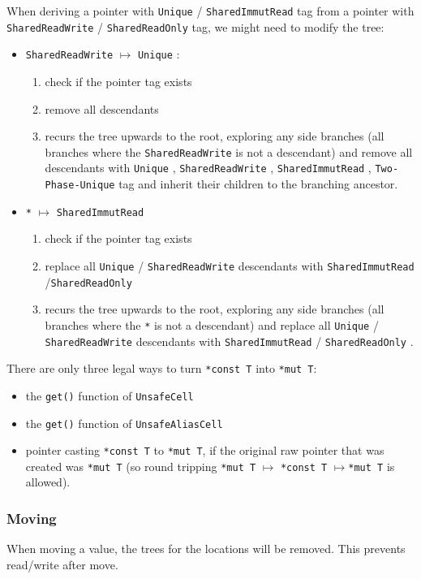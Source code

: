 \documentclass[]{article}
\newcommand{\SHRW}{\texttt{SharedReadWrite} }
\newcommand{\SHRO}{\texttt{SharedReadOnly} }
\newcommand{\SHIR}{\texttt{SharedImmutRead} }
\newcommand{\UNQ}{\texttt{Unique} }
\newcommand{\TPU}{\texttt{Two-Phase-Unique} }
\begin{document}
When deriving a pointer with \UNQ / \SHIR tag from a pointer with \SHRW / \SHRO tag, we might need to modify the tree:
\begin{itemize}
    \item \SHRW $\mapsto$ \UNQ:
    \begin{enumerate}
        \item check if the pointer tag exists
        \item remove all descendants
        \item recurs the tree upwards to the root, exploring any side branches (all branches where the \SHRW is not a descendant) and remove all descendants with \UNQ, \SHRW, \SHIR, \TPU tag and inherit their children to the branching ancestor.
    \end{enumerate}
    \item \texttt{*} $\mapsto$ \SHIR
    \begin{enumerate}
        \item check if the pointer tag exists
        \item replace all \UNQ/ \SHRW descendants with \SHIR/\SHRO
        \item recurs the tree upwards to the root, exploring any side branches (all branches where the \texttt{*} is not a descendant) and replace all \UNQ/ \SHRW descendants with \SHIR/ \SHRO.
    \end{enumerate}
\end{itemize}

\noindent There are only three legal ways to turn \texttt{*const T} into \texttt{*mut T}:
\begin{itemize}
    \item the \texttt{get()} function of \texttt{UnsafeCell}
    \item the \texttt{get()} function of \texttt{UnsafeAliasCell}
    \item pointer casting \texttt{*const T} to \texttt{*mut T}, if the original raw pointer that was created was \texttt{*mut T} (so round tripping \texttt{*mut T} $\mapsto$ \texttt{*const T} $\mapsto$\texttt{*mut T} is allowed).
\end{itemize}

\subsubsection{Moving}

When moving a value, the trees for the locations will be removed. This prevents read/write after move.
\end{document}
